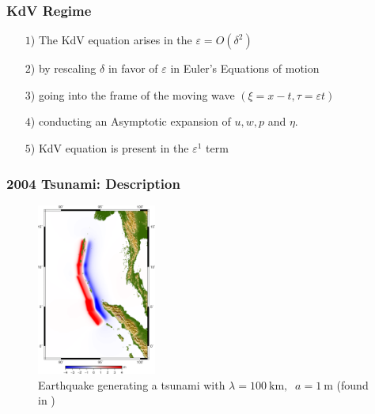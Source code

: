 \documentclass[fleqn]{beamer}
\begin{document}
    \begin{frame}
        \frametitle{KdV Regime}
        \begin{itemize}
            \item[$1$)]  The KdV equation arises in the $\varepsilon = O(\delta^2)$
            \item[$2$)] by rescaling $\delta$ in favor of $\varepsilon$ in
                Euler's Equations of motion
            \item[$3$)] going into the frame of the moving wave $(\xi = x- t, \tau = \varepsilon t)$
            \item[$4$)] conducting an Asymptotic expansion of $u , w, p$ and $\eta$.
            \item[$5$)] KdV equation is present in the $\varepsilon^1$ term
        \end{itemize}
    \end{frame}

    \begin{frame}
        \frametitle{2004 Tsunami: Description}

        \begin{figure}[htpb]
            \centering
            \includegraphics[width=0.35\textwidth]{./pics/water-surface.png}
            \caption{Earthquake generating a tsunami with $\lambda = 100\
            \text{km},\;\; a = 1\ \text{m}$ (found in \cite{graph_meter})}
        \end{figure}
    \end{frame}
\end{document}
